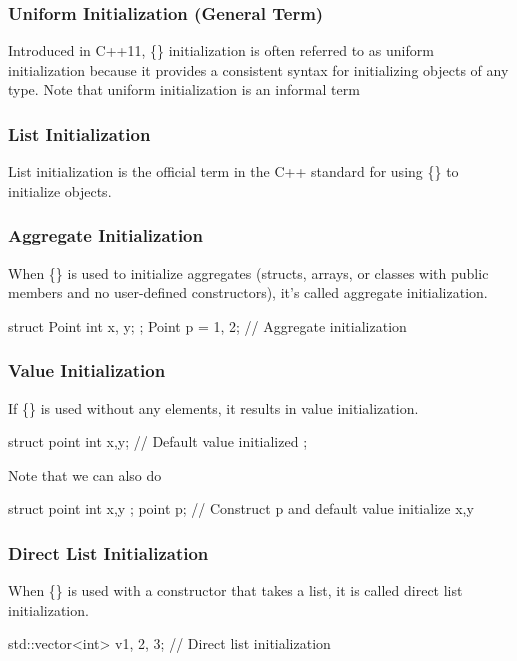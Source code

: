 \documentclass{report}
\begin{document}
    \subsubsection{Uniform Initialization (General Term)}
    \bigbreak \noindent 
    Introduced in C++11, \{\} initialization is often referred to as uniform initialization because it provides a consistent syntax for initializing objects of any type.
    \bigbreak \noindent 
    Note that uniform initialization is an informal term


    \bigbreak \noindent 
    \subsubsection{List Initialization}
    \bigbreak \noindent 
    List initialization is the official term in the C++ standard for using \{\} to initialize objects.

    \bigbreak \noindent 
    \subsubsection{Aggregate Initialization}
    \bigbreak \noindent 
    When \{\} is used to initialize aggregates (structs, arrays, or classes with public members and no user-defined constructors), it's called aggregate initialization.
    \bigbreak \noindent 
    \begin{cppcode}
        struct Point {
            int x, y;
        };
        Point p = {1, 2}; // Aggregate initialization
    \end{cppcode}


    \bigbreak \noindent 
    \subsubsection{Value Initialization}
    \bigbreak \noindent 
    If \{\} is used without any elements, it results in value initialization.
    \bigbreak \noindent 
    \begin{cppcode}
        struct  point {
            int x{},y{}; // Default value initialized
        };
    \end{cppcode}
    \bigbreak \noindent 
    Note that we can also do
    \bigbreak \noindent 
    \begin{cppcode}
        struct point {
            int x,y
        };
        point p{}; // Construct p and default value initialize x,y
    \end{cppcode}

    \bigbreak \noindent 
    \subsubsection{Direct List Initialization}
    \bigbreak \noindent 
    When \{\} is used with a constructor that takes a list, it is called direct list initialization.
    \bigbreak \noindent 
    \begin{cppcode}
    std::vector<int> v{1, 2, 3}; // Direct list initialization
    \end{cppcode}
\end{document}

